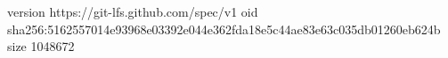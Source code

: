 version https://git-lfs.github.com/spec/v1
oid sha256:5162557014e93968e03392e044e362fda18e5c44ae83e63c035db01260eb624b
size 1048672
